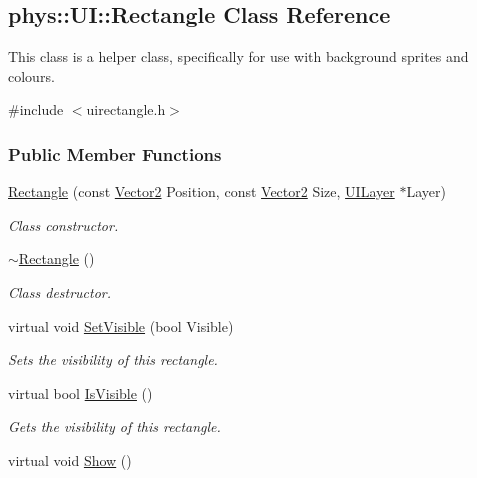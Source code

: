 \hypertarget{classphys_1_1UI_1_1Rectangle}{
\subsection{phys::UI::Rectangle Class Reference}
\label{d1/d5d/classphys_1_1UI_1_1Rectangle}
}


This class is a helper class, specifically for use with background sprites and colours.  




{\ttfamily \#include $<$uirectangle.h$>$}

\subsubsection*{Public Member Functions}
\begin{DoxyCompactItemize}
\item 
\hyperlink{classphys_1_1UI_1_1Rectangle_ad28910ef2ccf9fcc15fa4496d4b8456b}{Rectangle} (const \hyperlink{classphys_1_1Vector2}{Vector2} Position, const \hyperlink{classphys_1_1Vector2}{Vector2} Size, \hyperlink{classphys_1_1UILayer}{UILayer} $\ast$Layer)
\begin{DoxyCompactList}\small\item\em Class constructor. \item\end{DoxyCompactList}\item 
\hypertarget{classphys_1_1UI_1_1Rectangle_a8862c7e04c2b8911eac4a2d3b6aff165}{
\hyperlink{classphys_1_1UI_1_1Rectangle_a8862c7e04c2b8911eac4a2d3b6aff165}{$\sim$Rectangle} ()}
\label{d1/d5d/classphys_1_1UI_1_1Rectangle_a8862c7e04c2b8911eac4a2d3b6aff165}

\begin{DoxyCompactList}\small\item\em Class destructor. \item\end{DoxyCompactList}\item 
virtual void \hyperlink{classphys_1_1UI_1_1Rectangle_a4fa5021010e8cdaf9a9e35b3d4c82461}{SetVisible} (bool Visible)
\begin{DoxyCompactList}\small\item\em Sets the visibility of this rectangle. \item\end{DoxyCompactList}\item 
virtual bool \hyperlink{classphys_1_1UI_1_1Rectangle_aad47a2d9a7c9d8d9111b2edbf44541d5}{IsVisible} ()
\begin{DoxyCompactList}\small\item\em Gets the visibility of this rectangle. \item\end{DoxyCompactList}\item 
\hypertarget{classphys_1_1UI_1_1Rectangle_ab408c7607150b24fbc4f70870705a121}{
virtual void \hyperlink{classphys_1_1UI_1_1Rectangle_ab408c7607150b24fbc4f70870705a121}{Show} ()}
\label{d1/d5d/classphys_1_1UI_1_1Rectangle_ab408c7607150b24fbc4f70870705a121}


\end{DoxyCompactItemize}
